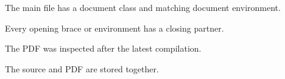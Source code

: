 \begin{chapterchecklist}
  \item The main file has a document class and matching document environment.
  \item Every opening brace or environment has a closing partner.
  \item The PDF was inspected after the latest compilation.
  \item The source and PDF are stored together.
\end{chapterchecklist}
